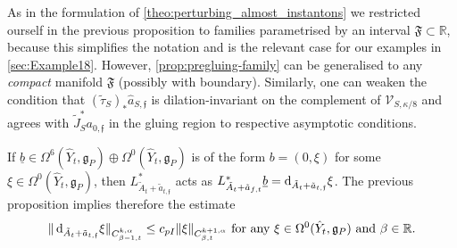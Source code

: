\documentclass[11pt,a4paper]{scrartcl}
\newcommand{\ita}[1]{\textit{#1}}
\newcommand*\diff{\mathop{}\!\textup{d}}
\newcommand{\VertWHt}[3]{\Vert_{C^{{#1},\alpha}_{{#2},t}{#3}}}
\numberwithin{equation}{section}
\theoremstyle{plain}
\theoremstyle{definition}
\theoremstyle{remark}
\begin{document}
\begin{remark}\label{rem: pregluing families weakening assumptions}
As in the formulation of \autoref{theo:perturbing_almost_instantons} we restricted ourself in the previous proposition to families parametrised by an interval $\mathfrak{F} \subset \mathbb{R}$, because this simplifies the notation and is the relevant case for our examples in \autoref{sec:Example18}. However, \autoref{prop:pregluing-family} can be generalised to any \ita{compact} manifold $\mathfrak{F}$ (possibly with boundary). Similarly, one can weaken the condition that $(\tilde{\tau}_S)_* \hat{a}_{S,\mathfrak{f}}$ is dilation-invariant on the complement of $\mathcal{V}_{S,\kappa/8}$ and agrees with $\tilde{J}_S^*a_{0,\mathfrak{f}}$ in the gluing region to respective asymptotic conditions.
\end{remark}
\begin{remark}\label{rem: estimate on d_A^*}
If $\underline{b} \in \Omega^6(\hat{Y}_t,\mathfrak{g}_P)\oplus \Omega^0(\hat{Y}_t,\mathfrak{g}_P)$ is of the form $b=(0,\xi)$ for some $\xi \in \Omega^0(\hat{Y}_t,\mathfrak{g}_P)$, then $L_{\tilde{A}_t+\tilde{a}_{t,\mathfrak{f}}}^*$ acts as $L_{\tilde{A}_t+\tilde{a}_{f,t}}^* \underline{b} = \diff_{\tilde{A}_t + \tilde{a}_{t,\mathfrak{f}}} \xi$. The previous proposition implies therefore the estimate \[\Vert \diff_{\tilde{A}_t + \tilde{a}_{t,\mathfrak{f}}} \xi \VertWHt{k}{\beta-1}{} \leq c_{pI} \Vert \xi \VertWHt{k+1}{\beta}{} \textup{ for any $\xi \in \Omega^0(\hat{Y}_t,\mathfrak{g}_P)$ and $\beta \in \mathbb{R}$.} \]
\end{remark}
\end{document}
